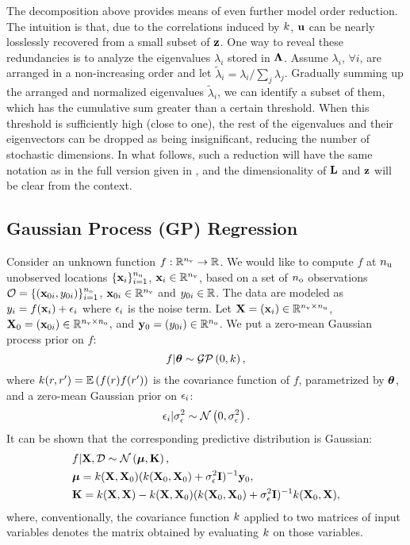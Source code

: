 The decomposition above provides means of even further model order reduction. The intuition is that, due to the correlations induced by $\fCov$, $\mathbf{u}$ can be nearly losslessly recovered from a small subset of $\mathbf{z}$. One way to reveal these redundancies is to analyze the eigenvalues $\lambda_i$ stored in $\mathbf{\Lambda}$. Assume $\lambda_i$, $\forall i$, are arranged in a non-increasing order and let $\tilde{\lambda}_i = \lambda_i / \sum_j \lambda_j$. Gradually summing up the arranged and normalized eigenvalues $\tilde{\lambda}_i$, we can identify a subset of them, which has the cumulative sum greater than a certain threshold. When this threshold is sufficiently high (close to one), the rest of the eigenvalues and their eigenvectors can be dropped as being insignificant, reducing the number of stochastic dimensions. In what follows, such a reduction will have the same notation as in the full version given in , and the dimensionality of $\mathbf{L}$ and $\mathbf{z}$ will be clear from the context.

\subsection{Gaussian Process (GP) Regression} 
Consider an unknown function $f: \mathbb{R}^{n_\text{v}} \to \mathbb{R}$. We would like to compute $f$ at ${n_\text{u}}$ unobserved locations $\{ \mathbf{x}_i \}_{i = 1}^{n_\text{u}}$, $\mathbf{x}_i \in \mathbb{R}^{n_\text{v}}$, based on a set of ${n_\text{o}}$ observations $\mathcal{O} = \{ (\mathbf{x}_{0i}, y_{0i}) \}_{i = 1}^{n_\text{o}}$, $\mathbf{x}_{0i} \in \mathbb{R}^{n_\text{v}}$ and $y_{0i} \in \mathbb{R}$. The data are modeled as $y_i = f(\mathbf{x}_i) + \epsilon_i$ where $\epsilon_i$ is the noise term. Let $\mathbf{X} = (\mathbf{x}_i) \in \mathbb{R}^{{n_\text{v}} \times {n_\text{u}}}$, $\mathbf{X}_0 = (\mathbf{x}_{0i}) \in \mathbb{R}^{{n_\text{v}} \times {n_\text{o}}}$, and $\mathbf{y}_0 = (y_{0i}) \in \mathbb{R}^{n_\text{o}}$. We put a zero-mean Gaussian process prior on $f$:
\[
  f | \vparam \sim \gaussianp{0}{\fCov},
\]
where $\fCov{\r, \r'} = \E{f(\r) f(\r')}$ is the covariance function of $f$, parametrized by ${\boldsymbol\theta}$, and a zero-mean Gaussian prior on $\epsilon_i$:
\[
  \epsilon_i | \sigma^2_\epsilon \sim \mathcal{N}\left( 0, \sigma^2_\epsilon \right).
\]
It can be shown \cite{mackay2003, rasmussen2006} that the corresponding predictive distribution is Gaussian:
\begin{align*}
  & f | \m{X}, \Data \sim \gaussian{\vmean}{\mCov}, \\
  & \vmean = \fCov{\m{X}, \m{X}_0} (\fCov{\m{X}_0, \m{X}_0} + \sigma^2_\noise \mI)^{-1} \v{y}_0, \\
  & \mCov = \fCov{\m{X}, \m{X}} - \fCov{\m{X}, \m{X}_0} (\fCov{\m{X}_0, \m{X}_0} + \sigma^2_\noise \mI)^{-1} \fCov{\m{X}_0, \m{X}},
\end{align*}
where, conventionally, the covariance function $\fCov$ applied to two matrices of input variables denotes the matrix obtained by evaluating $\fCov$ on those variables.
